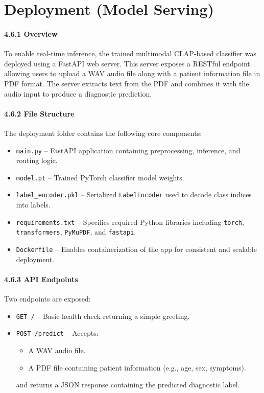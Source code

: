 \section{Deployment (Model Serving)}

\paragraph{4.6.1 Overview\\}
To enable real-time inference, the trained multimodal CLAP-based classifier was deployed using a FastAPI web server. This server exposes a RESTful endpoint allowing users to upload a WAV audio file along with a patient information file in PDF format. The server extracts text from the PDF and combines it with the audio input to produce a diagnostic prediction.

\paragraph{4.6.2 File Structure\\}
The deployment folder contains the following core components:

\begin{itemize}
    \item \texttt{main.py} – FastAPI application containing preprocessing, inference, and routing logic.
    \item \texttt{model.pt} – Trained PyTorch classifier model weights.
    \item \texttt{label\_encoder.pkl} – Serialized \texttt{LabelEncoder} used to decode class indices into labels.
    \item \texttt{requirements.txt} – Specifies required Python libraries including \texttt{torch}, \texttt{transformers}, \texttt{PyMuPDF}, and \texttt{fastapi}.
    \item \texttt{Dockerfile} – Enables containerization of the app for consistent and scalable deployment.
\end{itemize}

\paragraph{4.6.3 API Endpoints\\}
Two endpoints are exposed:
\begin{itemize}
    \item \texttt{GET /} – Basic health check returning a simple greeting.
    \item \texttt{POST /predict} – Accepts:
    \begin{itemize}
        \item A WAV audio file.
        \item A PDF file containing patient information (e.g., age, sex, symptoms).
    \end{itemize}
    and returns a JSON response containing the predicted diagnostic label.
\end{itemize}

